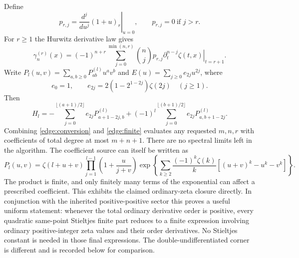 Define
\[
 p_{r,j}=\left.\frac{d^j}{du^j}(1+u)_r\right|_{u=0},
 \qquad p_{r,j}=0\ \text{if }j>r.
\]
For $r\ge1$ the Hurwitz derivative law gives
\begin{equation}
 \gamma_n^{(r)}(x)=(-1)^{n+r}
       \sum_{j=0}^{\min(n,r)}\binom nj p_{r,j}
            \left.\partial_t^{n-j}\zeta(t,x)\right|_{t=r+1}.
 \label{edge:conversion}
\end{equation}
Write $P_l(u,v)=\sum_{a,b\ge0}P^{(l)}_{ab}u^av^b$ and
$E(u)=\sum_{j\ge0}e_{2j}u^{2j}$, where
\[
 e_0=1,\qquad e_{2j}=2(1-2^{1-2j})\zeta(2j)\quad(j\ge1).
\]
Then
\begin{equation}
 [u^av^b]H_l=
 -\sum_{j=0}^{\lfloor(a+1)/2\rfloor}e_{2j}P^{(l)}_{a+1-2j,b}
 +(-1)^l\sum_{j=0}^{\lfloor(b+1)/2\rfloor}
                        e_{2j}P^{(l)}_{a,b+1-2j}.
 \label{edge:finite}
\end{equation}
Combining \eqref{edge:conversion} and \eqref{edge:finite} evaluates
any requested $m,n,r$ with coefficients of total degree at most
$m+n+1$.  There are no spectral limits left in the algorithm.
The coefficient source can itself be written as
\begin{equation}
 P_l(u,v)=\zeta(l+u+v)
       \prod_{j=1}^{l-1}\left(1+\frac{u}{j+v}\right)
       \exp\left\{
       \sum_{k\ge2}\frac{(-1)^k\zeta(k)}k
                    [(u+v)^k-u^k-v^k]\right\}.
 \label{edge:coefficient-source}
\end{equation}
The product is finite, and only finitely many terms of the exponential
can affect a prescribed coefficient.  This exhibits the claimed
ordinary-zeta closure directly.
In conjunction with the inherited positive-positive sector this proves
a useful uniform statement: whenever the total ordinary derivative
order is positive, every quadratic same-point Stieltjes finite part
reduces to a finite expression involving ordinary positive-integer
zeta values and their order derivatives.  No Stieltjes constant
is needed in those final expressions.  The double-undifferentiated
corner is different and is recorded below for comparison.

